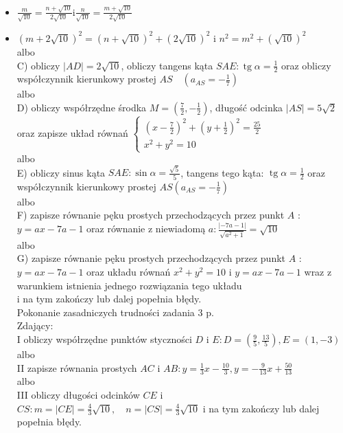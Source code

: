 \documentclass[10pt]{article}
\begin{document}
\begin{itemize}
  \item $\frac{m}{\sqrt{10}}=\frac{n+\sqrt{10}}{2 \sqrt{10}} \mathrm{i} \frac{n}{\sqrt{10}}=\frac{m+\sqrt{10}}{2 \sqrt{10}}$
  \item $(m+2 \sqrt{10})^{2}=(n+\sqrt{10})^{2}+(2 \sqrt{10})^{2}$ i $n^{2}=m^{2}+(\sqrt{10})^{2}$\\
albo\\
C) obliczy $|A D|=2 \sqrt{10}$, obliczy tangens kąta $S A E: \operatorname{tg} \alpha=\frac{1}{2}$ oraz obliczy współczynnik kierunkowy prostej $A S \quad\left(a_{A S}=-\frac{1}{7}\right)$\\
albo\\
D) obliczy współrzędne środka $M=\left(\frac{7}{2},-\frac{1}{2}\right)$, długość odcinka $|A S|=5 \sqrt{2}$ oraz zapisze układ równań $\left\{\begin{array}{l}\left(x-\frac{7}{2}\right)^{2}+\left(y+\frac{1}{2}\right)^{2}=\frac{25}{2} \\ x^{2}+y^{2}=10\end{array}\right.$\\
albo\\
E) obliczy sinus kąta $S A E: \sin \alpha=\frac{\sqrt{5}}{5}$, tangens tego kąta: $\operatorname{tg} \alpha=\frac{1}{2}$ oraz współczynnik kierunkowy prostej $A S\left(a_{A S}=-\frac{1}{7}\right)$\\
albo\\
F) zapisze równanie pęku prostych przechodzących przez punkt $A$ : $y=a x-7 a-1$ oraz równanie z niewiadomą $a: \frac{|-7 a-1|}{\sqrt{a^{2}+1}}=\sqrt{10}$\\
albo\\
G) zapisze równanie pęku prostych przechodzących przez punkt $A$ : $y=a x-7 a-1$ oraz układu równań $x^{2}+y^{2}=10$ i $y=a x-7 a-1$ wraz z warunkiem istnienia jednego rozwiązania tego układu\\
i na tym zakończy lub dalej popełnia błędy.\\
Pokonanie zasadniczych trudności zadania 3 p.\\
Zdający:\\
I obliczy współrzędne punktów styczności $D$ i $E: D=\left(\frac{9}{5}, \frac{13}{5}\right), E=(1,-3)$\\
albo\\
II zapisze równania prostych $A C$ i $A B: y=\frac{1}{3} x-\frac{10}{3}, y=-\frac{9}{13} x+\frac{50}{13}$\\
albo\\
III obliczy długości odcinków $C E$ i $C S: m=|C E|=\frac{4}{3} \sqrt{10}, \quad n=|C S|=\frac{4}{3} \sqrt{10}$ i na tym zakończy lub dalej popełnia błędy.
\end{itemize}
\end{document}
